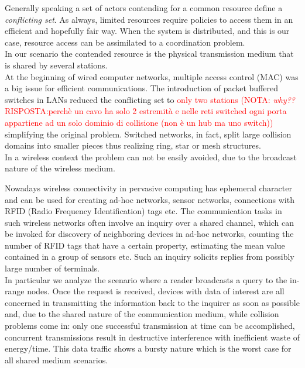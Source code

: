 \documentclass[11pt,a4paper,twoside,openright]{book}
\newcommand{\rev}[1]{\textcolor{Cerulean}{#1}}
\begin{document}
Generally speaking a set of actors contending for a common resource define a \emph{conflicting set}. As always, limited resources require policies to access them in an efficient and hopefully fair way. When the system is distributed, and this is our case, resource access can be assimilated to a coordination problem.\\ 
\rev{In our scenario the contended resource is the physical transmission medium that is shared by several stations.}\\ \rev{At the beginning of wired computer networks, multiple access control (MAC) was a big issue for efficient communications. The introduction of packet buffered switches  in LANs reduced the conflicting set to \textcolor{red}{only two stations (NOTA: \marginpar{$\leftarrow$ NOTA, OK?}\emph{why??} RISPOSTA:perchè un cavo ha solo 2 estremità e nelle reti switched ogni porta appartiene ad un solo dominio di collisione (non è un hub ma uno switch))}  simplifying  the original problem. Switched networks, in fact, split large collision domains into smaller pieces thus realizing ring, star or mesh structures.\\ 
In a wireless context the problem can not be easily avoided, due to the broadcast nature of the wireless medium.\\  
}

Nowadays wireless connectivity in pervasive computing has ephemeral character and can be used for creating ad-hoc networks, sensor networks, connections with RFID (Radio Frequency Identification) tags etc. The communication tasks in such wireless networks often involve an inquiry over a shared channel, which can be invoked for discovery of neighboring devices in ad-hoc networks, counting the number of RFID tags that have a certain property, estimating the mean value contained in a group of sensors etc. Such an inquiry solicits replies from possibly large number of terminals.\\

In particular we analyze the scenario where a reader broadcasts a query to the in-range nodes. Once the request is received, devices with data of interest are all concerned in transmitting the information back to the inquirer as soon as possible and, due to the shared nature of the communication medium,  while collision problems come in: only one successful transmission at time can be accomplished, concurrent transmissions result in destructive interference with inefficient waste of energy/time. This data traffic shows a bursty nature which is the worst case for all shared medium scenarios.\\
\end{document}
